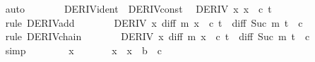 \begin{isabellebody}
\ \ \ \ \ \ \isamarkupfalse%
\ auto\isanewline
\ \ \ \ \isamarkupfalse%
\ \isamarkupfalse%
\ DERIV{\isacharunderscore}{\kern0pt}ident\ \ DERIV{\isacharunderscore}{\kern0pt}const\ \isamarkupfalse%
\ {\isachardoublequoteopen}DERIV\ {\isacharparenleft}{\kern0pt}{\isasymlambda}x{\isachardot}{\kern0pt}\ x\ {\isacharplus}{\kern0pt}\ c{\isacharparenright}{\kern0pt}\ t\ {\isacharcolon}{\kern0pt}{\isachargreater}{\kern0pt}\ {}\ {\isacharplus}{\kern0pt}\ {}{\isachardoublequoteclose}\isanewline
\ \ \ \ \ \ \isamarkupfalse%
\ {\isacharparenleft}{\kern0pt}rule\ DERIV{\isacharunderscore}{\kern0pt}add{\isacharparenright}{\kern0pt}\isanewline
\ \ \ \ \isamarkupfalse%
\ \isamarkupfalse%
\ {\isachardoublequoteopen}DERIV\ {\isacharparenleft}{\kern0pt}{\isasymlambda}x{\isachardot}{\kern0pt}\ diff\ m\ {\isacharparenleft}{\kern0pt}x\ {\isacharplus}{\kern0pt}\ c{\isacharparenright}{\kern0pt}{\isacharparenright}{\kern0pt}\ t\ {\isacharcolon}{\kern0pt}{\isachargreater}{\kern0pt}\ diff\ {\isacharparenleft}{\kern0pt}Suc\ m{\isacharparenright}{\kern0pt}\ {\isacharparenleft}{\kern0pt}t\ {\isacharplus}{\kern0pt}\ c{\isacharparenright}{\kern0pt}\ {\isacharasterisk}{\kern0pt}\ {\isacharparenleft}{\kern0pt}{}\ {\isacharplus}{\kern0pt}\ {}{\isacharparenright}{\kern0pt}{\isachardoublequoteclose}\isanewline
\ \ \ \ \ \ \isamarkupfalse%
\ {\isacharparenleft}{\kern0pt}rule\ DERIV{\isacharunderscore}{\kern0pt}chain{}{\isacharparenright}{\kern0pt}\isanewline
\ \ \ \ \isamarkupfalse%
\ \isamarkupfalse%
\ {\isachardoublequoteopen}DERIV\ {\isacharparenleft}{\kern0pt}{\isasymlambda}x{\isachardot}{\kern0pt}\ diff\ m\ {\isacharparenleft}{\kern0pt}x\ {\isacharplus}{\kern0pt}\ c{\isacharparenright}{\kern0pt}{\isacharparenright}{\kern0pt}\ t\ {\isacharcolon}{\kern0pt}{\isachargreater}{\kern0pt}\ diff\ {\isacharparenleft}{\kern0pt}Suc\ m{\isacharparenright}{\kern0pt}\ {\isacharparenleft}{\kern0pt}t\ {\isacharplus}{\kern0pt}\ c{\isacharparenright}{\kern0pt}{\isachardoublequoteclose}\isanewline
\ \ \ \ \ \ \isamarkupfalse%
\ simp\isanewline
\ \ \isamarkupfalse%
\isanewline
\ \ \isamarkupfalse%
\ \isamarkupfalse%
\ x\ \isanewline
\ \ \ \ {\isachardoublequoteopen}{}\ {\isacharless}{\kern0pt}\ x\ {\isasymand}\ x\ {\isacharless}{\kern0pt}\ b\ {\isacharminus}{\kern0pt}\ c\ {\isasymand}\isanewline

\end{isabellebody}
